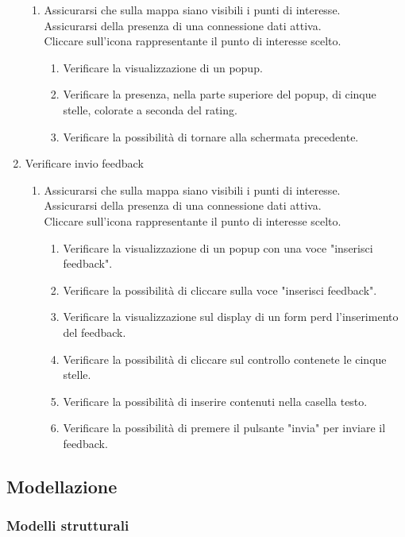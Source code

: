 \begin{enumerate}
\begin{enumerate}
\item Assicurarsi che sulla mappa siano visibili i punti di interesse.\\
Assicurarsi della presenza di una connessione dati attiva.\\
Cliccare sull'icona rappresentante il punto di interesse scelto.
\begin{enumerate}
\item Verificare la visualizzazione di un popup.
\item Verificare la presenza, nella parte superiore del popup, di cinque stelle, colorate a seconda del rating.
\item Verificare la possibilità di tornare alla schermata precedente.
\end{enumerate}
\end{enumerate}
\item Verificare invio feedback
\begin{enumerate}
\item Assicurarsi che sulla mappa siano visibili i punti di interesse.\\
Assicurarsi della presenza di una connessione dati attiva.\\
Cliccare sull'icona rappresentante il punto di interesse scelto.
\begin{enumerate}
\item Verificare la visualizzazione di un popup con una voce "inserisci feedback".
\item Verificare la possibilità di cliccare sulla voce "inserisci feedback".
\item Verificare la visualizzazione sul display di un form perd l'inserimento del feedback.
\item Verificare la possibilità di cliccare sul controllo contenete le cinque stelle.
\item Verificare la possibilità di inserire contenuti nella casella testo.
\item Verificare la possibilità di premere il pulsante "invia" per inviare il feedback.
\end{enumerate}
\end{enumerate}
\end{enumerate}


\subsection{Modellazione}
\subsubsection{Modelli strutturali}
